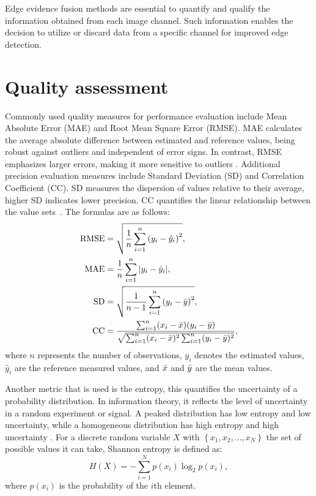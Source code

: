 \documentclass{article}
\begin{document}
Edge evidence fusion methods are essential to quantify and qualify the information obtained from each image channel. 
Such information enables the decision to utilize or discard data from a specific channel for improved edge detection.

\section{Quality assessment}

Commonly used quality measures for performance evaluation include Mean Absolute Error (MAE) and Root Mean Square Error (RMSE). MAE calculates the average absolute difference between estimated and reference values, being robust against outliers and independent of error signs. In contrast, RMSE emphasizes larger errors, making it more sensitive to outliers \cite{Ritter2013}. Additional precision evaluation measures include Standard Deviation (SD) and Correlation Coefficient (CC). SD measures the dispersion of values relative to their average, higher SD indicates lower precision. CC quantifies the linear relationship between the value sets~\cite{Vijayaraj}. The formulas are as follows:
\begin{align*}
	\text{RMSE} &=\sqrt{\frac{1}{n}\sum_{i=1}^{n}\left(y_i-\hat{y}_i\right)^2},\\
	\text{MAE} &=\frac{1}{n}\sum_{i=1}^{n}|y_i-\hat{y}_i|,\\
	\text{SD} &=\sqrt{\frac{1}{n-1}\sum_{i=1}^{n}\left(y_i-\bar{y}\right)^2},\\
\text{CC}&=  \frac{\sum_{i=1}^{n}(x_i-\Bar{x})(y_i-\Bar{y})}{\sqrt{\sum_{i=1}^{n}(x_i-\Bar{x})^2\sum_{i=1}^{n}(y_i-\Bar{y})^2}},
\end{align*}
where $n$ represents the number of observations, $y_i$ denotes the estimated values, $\hat{y}_i$ are the reference measured values, and  $\Bar{x}$ and $\Bar{y}$ are the mean values.

 Another metric that is used is the entropy, this quantifies the uncertainty of a probability distribution. In information theory, it reflects the level of uncertainty in a random experiment or signal. A peaked distribution has low entropy and low uncertainty, while a homogeneous distribution has high entropy and high uncertainty \cite{Mays2002}. For a discrete random variable $X$ with $\left\{x_1, x_2, \ldots, x_N\right\}$ the set of possible values it can take, Shannon entropy is defined as:
\begin{equation}
	H(X)=-\sum_{i=1}^{N}p(x_i)\log_2p(x_i),
	\label{eq:H}
\end{equation}
where $p(x_i)$ is the probability of the $i$th element.
\end{document}
